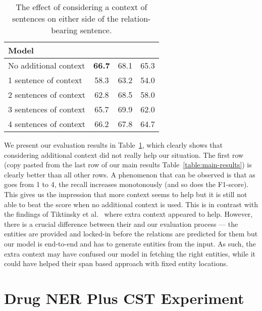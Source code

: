 \documentclass[conference]{IEEEtran}
\begin{document}
\begin{table}[h]
\centering
\renewcommand{\arraystretch}{1.3}
\caption{The effect of considering a context of  sentences on either side of the relation-bearing sentence.}
\label{tb:long-context}
\begin{tabular}{lccc}
\toprule
Model &  &  & \\\midrule
No additional context & \textbf{66.7} & 68.1 & 65.3 \\
 1 sentence of context & 58.3 & 63.2 & 54.0\\
 2 sentences of context & 62.8 & 68.5 & 58.0\\
 3 sentences of context & 65.7 & 69.9 & 62.0\\
 4 sentences of context & 66.2 & 67.8 & 64.7\\
\bottomrule
\end{tabular}


\end{table}

We present our evaluation results in Table~\ref{tb:long-context}, which clearly shows that considering additional context did not really help our situation. The first row (copy pasted from the last row of our main results  Table~\ref{table:main-results}) is clearly better than all other rows. A phenomenon that can be observed is that as  goes from 1 to 4, the recall increases monotonously (and so does the F1-score). This gives us the impression that more context seems to help but it is still not able to beat the score when no additional context is used. This is in contrast with the findings of Tiktinsky et al.~\cite{tiktinsky-etal-2022-dataset} where extra context appeared to help. However, there is a crucial difference between their and our evaluation process --- the entities are provided and locked-in before the relations are predicted for them but our model is end-to-end and has to generate entities from the input. As such, the extra context may have confused our model in fetching the right entities, while it could have helped their span based approach with fixed entity locations.  







\section{Drug NER Plus CST Experiment}
\end{document}
